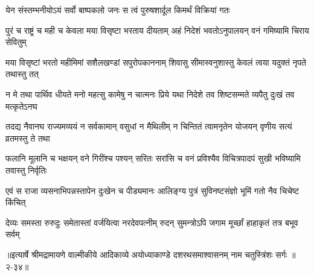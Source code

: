 \twolineshloka
{येन संस्तम्भनीयोऽयं सर्वो बाष्पकलो जनः}
{स त्वं पुरुषशार्दूल किमर्थं विक्रियां गतः} %

\twolineshloka
{पुरं च राष्ट्रं च मही च केवला मया विसृष्टा भरताय दीयताम्}
{अहं निदेशं भवतोऽनुपालयन् वनं गमिष्यामि चिराय सेवितुम्} %

\twolineshloka
{मया विसृष्टां भरतो महीमिमां सशैलखण्डां सपुरोपकाननाम्}
{शिवासु सीमास्वनुशास्तु केवलं त्वया यदुक्तं नृपते तथास्तु तत्} %

\twolineshloka
{न मे तथा पार्थिव धीयते मनो महत्सु कामेषु न चात्मनः प्रिये}
{यथा निदेशे तव शिष्टसम्मते व्यपैतु दुःखं तव मत्कृतेऽनघ} %

\twolineshloka
{तदद्य नैवानघ राज्यमव्ययं न सर्वकामान् वसुधां न मैथिलीम्}
{न चिन्तितं त्वामनृतेन योजयन् वृणीय सत्यं व्रतमस्तु ते तथा} %

\twolineshloka
{फलानि मूलानि च भक्षयन् वने गिरींश्च पश्यन् सरितः सरांसि च}
{वनं प्रविश्यैव विचित्रपादपं सुखी भविष्यामि तवास्तु निर्वृतिः} %

\twolineshloka
{एवं स राजा व्यसनाभिपन्नस्तापेन दुःखेन च पीड्यमानः}
{आलिङ्ग्य पुत्रं सुविनष्टसंज्ञो भूमिं गतो नैव चिचेष्ट किंचित्} %

\twolineshloka
{देव्यः समस्ता रुरुदुः समेतास्तां वर्जयित्वा नरदेवपत्नीम्}
{रुदन् सुमन्त्रोऽपि जगाम मूर्च्छां हाहाकृतं तत्र बभूव सर्वम्} %


॥इत्यार्षे श्रीमद्रामायणे वाल्मीकीये आदिकाव्ये अयोध्याकाण्डे दशरथसमाश्वासनम् नाम चतुस्त्रिंशः सर्गः ॥२-३४॥
